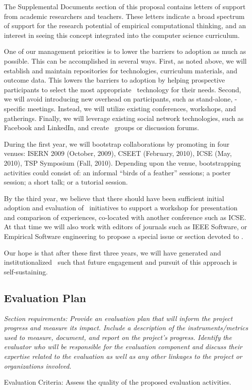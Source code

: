 The Supplemental Documents section of this proposal contains letters of
support from academic researchers and teachers.  These letters indicate a
broad spectrum of support for the research potential of empirical
computational thinking, and an interest in seeing this concept integrated
into the computer science curriculum.

One of our management priorities is to lower the barriers to adoption as
much as possible.  This can be accomplished in several ways. First, as
noted above, we will establish and maintain repositories for technologies,
curriculum materials, and outcome data.  This lowers the barriers to
adoption by helping prospective participants to select the most appropriate
\eCT\ technology for their needs.  Second, we will avoid introducing new
overhead on participants, such as stand-alone, \eCT-specific
meetings. Instead, we will utilize existing conferences, workshops, and
gatherings.  Finally, we will leverage existing social network
technologies, such as Facebook and LinkedIn, and create \eCT\ groups or
discussion forums.

During the first year, we will bootstrap collaborations by promoting \eCT
in four venues: ISERN 2009 (October, 2009), CSEET (February, 2010), ICSE
(May, 2010), TSP Symposium (Fall, 2010). Depending upon the venue,
bootstrapping activities could consist of: an informal ``birds of a
feather'' sessions; a poster session; a short talk; or a tutorial session.  

By the third year, we believe that there should have been sufficient
initial adoption and evaluation of \eCT\ initiatives to support a workshop
for presentation and comparison of experiences, co-located with another
conference such as ICSE.  At that time we will also work with editors of
journals such as IEEE Software, or Empirical Software engineering to
propose a special issue or section devoted to \eCT.

Our hope is that after these first three years, we will have generated and 
institutionalized \eCT\ such that future engagement and pursuit of this 
approach is self-sustaining. 

\subsection{Evaluation Plan}

{\em Section requirements: Provide an evaluation plan that will inform the
project progress and measure its impact.  Include a description of the
instruments/metrics used to measure, document, and report on the project's
progress.  Identify the evaluator who will be responsible for the
evaluation component and discuss their expertise related to the evaluation
as well as any other linkages to the project or organizations involved.

Evaluation Criteria: Assess the quality of the proposed evaluation activities. 
}
\bigskip

